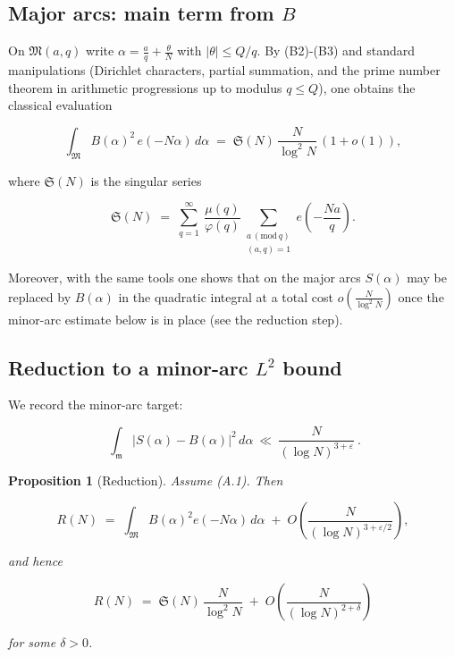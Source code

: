\documentclass[11pt]{article}
\newtheorem{proposition}[lemma]{Proposition}
\theoremstyle{definition}
\theoremstyle{remark}
\begin{document}
\subsection*{Major arcs: main term from $B$}

On $\mathfrak M(a,q)$ write $\alpha=\tfrac{a}{q}+\tfrac{\theta}{N}$ with
$|\theta|\le Q/q$. By (B2)-(B3) and standard manipulations (Dirichlet characters, partial summation, and the prime number theorem in arithmetic progressions up to modulus $q\le Q$), one obtains the classical evaluation

$$
	\int_{\mathfrak M} B(\alpha)^2\,e(-N\alpha)\,d\alpha
	\;=\;\mathfrak S(N)\,\frac{N}{\log^2 N}\,(1+o(1)),
$$

where $\mathfrak S(N)$ is the singular series

$$
	\mathfrak S(N)\;=\;\sum_{q=1}^{\infty}\ \frac{\mu(q)}{\varphi(q)}\!
	\sum_{\substack{a\,(\mathrm{mod}\,q)\\(a,q)=1}} e\!\left(-\frac{Na}{q}\right).
$$

Moreover, with the same tools one shows that on the major arcs $S(\alpha)$ may be replaced by $B(\alpha)$ in the quadratic integral at a total cost $o\!\left(\tfrac{N}{\log^2 N}\right)$ once the minor-arc estimate below is in place (see the reduction step).


\subsection*{Reduction to a minor-arc $L^2$ bound}

We record the minor-arc target:

\begin{equation}
	\boxed{\ \ \int_{\mathfrak m}\!\bigl|S(\alpha)-B(\alpha)\bigr|^{2}\,d\alpha
		\ \ll\ \frac{N}{(\log N)^{3+\varepsilon}}\ .\ }
	\tag{A.1}
\end{equation}

\begin{proposition}[Reduction]\label{prop:reduction}
	Assume (A.1). Then

	$$
		R(N)\;=\;\int_{\mathfrak M} B(\alpha)^2 e(-N\alpha)\,d\alpha\;+\;O\!\left(\frac{N}{(\log N)^{3+\varepsilon/2}}\right),
	$$

	and hence

	$$
		R(N)\;=\;\mathfrak S(N)\,\frac{N}{\log^{2}N}\;+\;O\!\left(\frac{N}{(\log N)^{2+\delta}}\right)
	$$

	for some $\delta>0$.

\end{proposition}
\end{document}
